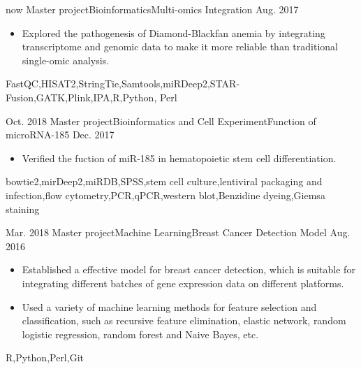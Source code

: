 %
%


 
\begin{experiences}
	
		
 \experience
    {now}   {Master project}{Bioinformatics}{Multi-omics Integration}
    {Aug. 2017} {
                      \begin{itemize}
                        \item Explored the pathogenesis of Diamond-Blackfan anemia by integrating transcriptome and genomic data to make it more reliable than traditional single-omic analysis.
                      \end{itemize}
                    }
                        {FastQC,HISAT2,StringTie,Samtools,miRDeep2,STAR-Fusion,GATK,Plink,IPA,R,Python, Perl}

  \emptySeparator
  \experience
    {Oct. 2018} {Master project}{Bioinformatics and Cell Experiment}{Function of microRNA-185}
    {Dec. 2017}    {
                      \begin{itemize}
                        \item Verified the fuction of miR-185 in hematopoietic stem cell differentiation. 
          
                      \end{itemize}
                    }
                       {bowtie2,mirDeep2,miRDB,SPSS,stem cell culture,lentiviral packaging and infection,flow cytometry,PCR,qPCR,western blot,Benzidine dyeing,Giemsa staining}

  \emptySeparator
  \experience
    {Mar. 2018} {Master project}{Machine Learning}{Breast Cancer Detection Model}
    {Aug. 2016}    {
                      \begin{itemize}
                        \item Established a effective model for breast cancer detection, which is suitable for integrating different batches of gene expression data on different platforms. 
                        \item Used a variety of machine learning methods for feature selection and classification, such as recursive feature elimination, elastic network, random logistic regression, random forest and Naive Bayes, etc.               
                      \end{itemize}
                    }
                       {R,Python,Perl,Git}


\end{experiences}
